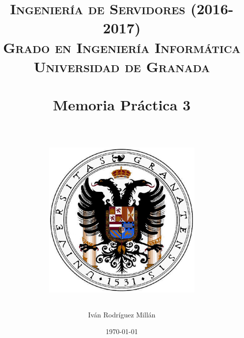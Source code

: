 


\title{	
\normalfont \normalsize 
\textsc{\textbf{Ingeniería de Servidores (2016-2017)} \\ Grado en Ingeniería Informática \\ Universidad de Granada} \\ [25pt] %
\horrule{0.5pt} \\[0.4cm] %
\huge Memoria Práctica 3 \\ %
\horrule{2pt} \\[0.5cm] %
\begin{figure}[!ht]
	\begin{center}
		\includegraphics[width=0.7\textwidth]{imagenes/escudo-de-la-universidad-de-granada}
	\end{center}
\end{figure}
}

\author{Iván Rodríguez Millán} %

\date{\normalsize\today} %




